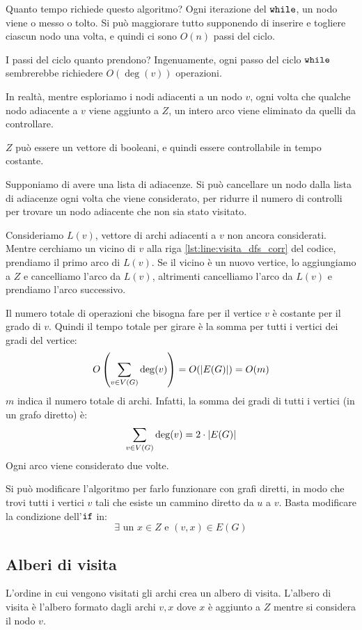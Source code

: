 Quanto tempo richiede questo algoritmo? Ogni iterazione del $\texttt{while}$, un nodo viene o messo o tolto. Si pu\`o maggiorare tutto supponendo di inserire e togliere ciascun nodo una volta, e quindi ci sono $O(n)$ passi del ciclo.

I passi del ciclo quanto prendono? Ingenuamente, ogni passo del ciclo $\texttt{while}$ sembrerebbe richiedere $O(\deg (v))$ operazioni.

In realt\`a, mentre esploriamo i nodi adiacenti a un nodo $v$, ogni volta che qualche nodo adiacente a $v$ viene aggiunto a $Z$, un intero arco viene eliminato da quelli da controllare.

$Z$ pu\`o essere un vettore di booleani, e quindi essere controllabile in tempo costante.

Supponiamo di avere una lista di adiacenze. Si pu\`o cancellare un nodo dalla lista di adiacenze ogni volta che viene considerato, per ridurre il numero di controlli per trovare un nodo adiacente che non sia stato visitato.

Consideriamo $L(v)$, vettore di archi adiacenti a $v$ non ancora considerati. Mentre cerchiamo un vicino di $v$ alla riga \ref{lst:line:visita_dfs_corr} del codice, prendiamo il primo arco di $L(v)$. Se il vicino \`e un nuovo vertice,  lo aggiungiamo a $Z$ e cancelliamo l'arco da $L(v)$, altrimenti cancelliamo l'arco da $L(v)$ e prendiamo l'arco successivo.

Il numero totale di operazioni che bisogna fare per il vertice $v$ \`e costante per il grado di $v$. Quindi il tempo totale per girare \`e la somma per tutti i vertici dei gradi del vertice:
\[
O \left( \sum_{v \in V(G)} \deg (v) \right) = O (\left\lvert{E(G)}\right\rvert) = O(m)
\]
$m$ indica il numero totale di archi. Infatti, la somma dei gradi di tutti i vertici (in un grafo diretto) \`e:
\[
\sum_{v \in V(G)} \deg (v) = 2 \cdot \left\lvert{E(G)}\right\rvert
\]
Ogni arco viene considerato due volte.

Si pu\`o modificare l'algoritmo per farlo funzionare con grafi diretti, in modo che trovi tutti i vertici $v$ tali che esiste un cammino diretto da $u$ a $v$. Basta modificare la condizione dell'$\texttt{if}$ in:
\[
\exists \text{ un } x \in Z \text{ e } (v,x) \in E(G)
\]

\subsection{Alberi di visita}

L'ordine in cui vengono visitati gli archi crea un albero di visita. L'albero di visita \`e l'albero formato dagli archi ${v, x}$ dove $x$ \`e aggiunto a $Z$ mentre si considera il nodo $v$.


